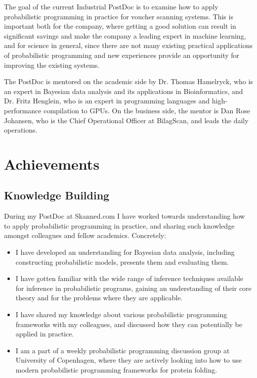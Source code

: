 \documentclass[12pt,a4paper]{article}
\begin{document}
The goal of the current Industrial PostDoc is to examine how to apply
probabilistic programming in practice for voucher scanning systems. This is
important both for the company, where getting a good solution can result in
significant savings and make the company a leading expert in machine learning,
and for science in general, since there are not many existing practical
applications of probabilistic programming and new experiences provide an
opportunity for improving the existing systems.

The PostDoc is mentored on the academic side by Dr. Thomas Hamelryck, who is an
expert in Bayesian data analysis and its applications in Bioinformatics, and
Dr. Fritz Henglein, who is an expert in programming languages and high-performance
compilation to GPUs. On the business side, the mentor is Dan Rose Johansen, who
is the Chief Operational Officer at BilagScan, and leads the daily operations.

\section{Achievements}
\subsection{Knowledge Building} During my PostDoc at Skanned.com I have worked
towards understanding how to apply probabilistic programming in practice, and
sharing such knowledge amongst colleagues and fellow academics.
Concretely:
\begin{itemize}
\item I have developed an understanding for Bayesian data analysis, including
  constructing probabilistic models, presents them and evaluating them.
\item I have gotten familiar with the wide range of inference techniques
  available for inference in probabilistic programs, gaining an understanding of
  their core theory and for the problems where they are applicable.
\item I have shared my knowledge about various probabilistic programming frameworks with
  my colleagues, and discussed how they can potentially be applied in practice.
\item I am a part of a weekly probabilistic programming discussion group at University of Copenhagen, where they are actively looking into
  how to use modern probabilistic programming frameworks for protein folding.
\end{itemize}
\end{document}
